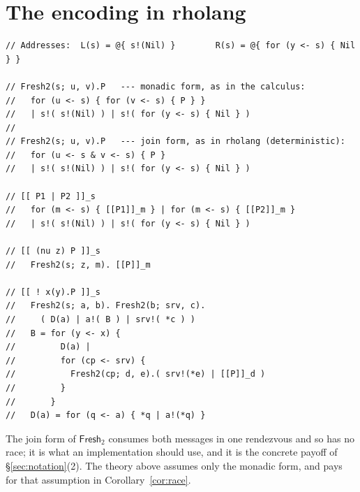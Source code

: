 \documentclass[11pt]{article}
\theoremstyle{definition}
\theoremstyle{plain}
\theoremstyle{remark}
\newcommand{\Frsh}{\mathsf{Fresh}_2}
\begin{document}
\section{The encoding in rholang}\label{app:rholang}

\begin{lstlisting}
// Addresses:  L(s) = @{ s!(Nil) }        R(s) = @{ for (y <- s) { Nil } }

// Fresh2(s; u, v).P   --- monadic form, as in the calculus:
//   for (u <- s) { for (v <- s) { P } }
//   | s!( s!(Nil) ) | s!( for (y <- s) { Nil } )
//
// Fresh2(s; u, v).P   --- join form, as in rholang (deterministic):
//   for (u <- s & v <- s) { P }
//   | s!( s!(Nil) ) | s!( for (y <- s) { Nil } )

// [[ P1 | P2 ]]_s
//   for (m <- s) { [[P1]]_m } | for (m <- s) { [[P2]]_m }
//   | s!( s!(Nil) ) | s!( for (y <- s) { Nil } )

// [[ (nu z) P ]]_s
//   Fresh2(s; z, m). [[P]]_m

// [[ ! x(y).P ]]_s
//   Fresh2(s; a, b). Fresh2(b; srv, c).
//     ( D(a) | a!( B ) | srv!( *c ) )
//   B = for (y <- x) {
//         D(a) |
//         for (cp <- srv) {
//           Fresh2(cp; d, e).( srv!(*e) | [[P]]_d )
//         }
//       }
//   D(a) = for (q <- a) { *q | a!(*q) }
\end{lstlisting}

\noindent
The join form of $\Frsh$ consumes both messages in one rendezvous and so
has no race; it is what an implementation should use, and it is the
concrete payoff of \S\ref{sec:notation}(2). The theory above assumes only
the monadic form, and pays for that assumption in
Corollary~\ref{cor:race}.
\end{document}

